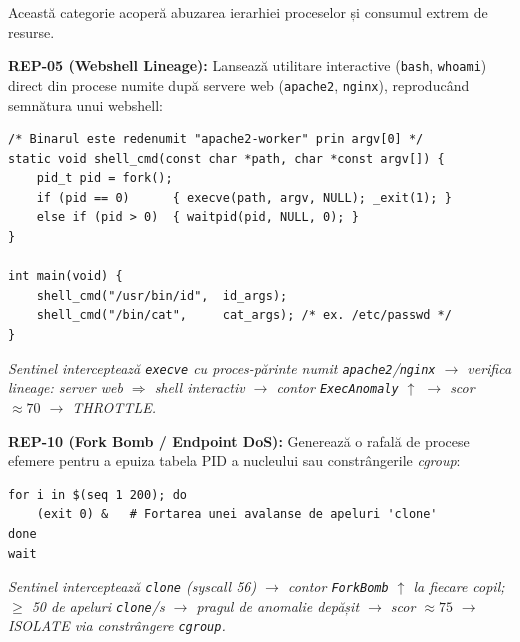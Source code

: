 \par Această categorie acoperă abuzarea ierarhiei proceselor și consumul extrem de resurse.

\par \textbf{REP-05 (Webshell Lineage):} Lansează utilitare interactive (\texttt{bash}, \texttt{whoami}) direct din procese numite după servere web (\texttt{apache2}, \texttt{nginx}), reproducând semnătura unui webshell:

\begin{lstlisting}[style=cstyle,caption={REP-05: Lansarea unui shell de către un worker web}]
/* Binarul este redenumit "apache2-worker" prin argv[0] */
static void shell_cmd(const char *path, char *const argv[]) {
    pid_t pid = fork();
    if (pid == 0)      { execve(path, argv, NULL); _exit(1); }
    else if (pid > 0)  { waitpid(pid, NULL, 0); }
}

int main(void) {
    shell_cmd("/usr/bin/id",  id_args);
    shell_cmd("/bin/cat",     cat_args); /* ex. /etc/passwd */
}
\end{lstlisting}
\par\textit{Sentinel interceptează \texttt{execve} cu proces-părinte numit \texttt{apache2}/\texttt{nginx} $\rightarrow$ verifica lineage: server web $\Rightarrow$ shell interactiv $\rightarrow$ contor \texttt{ExecAnomaly} $\uparrow$ $\rightarrow$ scor $\approx 70$ $\rightarrow$ THROTTLE.}

\par \textbf{REP-10 (Fork Bomb / Endpoint DoS):} Generează o rafală de procese efemere pentru a epuiza tabela PID a nucleului sau constrângerile \textit{cgroup}:

\begin{lstlisting}[style=bashstyle,caption={REP-10: Fork Bomb limitat (200 de procese efemere)}]
for i in $(seq 1 200); do
    (exit 0) &   # Fortarea unei avalanse de apeluri 'clone'
done
wait
\end{lstlisting}
\par\textit{Sentinel interceptează \texttt{clone} (syscall 56) $\rightarrow$ contor \texttt{ForkBomb} $\uparrow$ la fiecare copil; $\geq$ 50 de apeluri \texttt{clone}/s $\rightarrow$ pragul de anomalie depășit $\rightarrow$ scor $\approx 75$ $\rightarrow$ ISOLATE via constrângere \texttt{cgroup}.}
